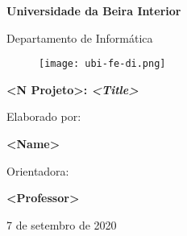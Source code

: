 \thispagestyle{empty}
\setcounter{page}{-1}

\begin{center}
\begin{Huge}
\textbf{Universidade da Beira Interior}
\end{Huge}
\end{center}

\begin{center}
\begin{Huge}
Departamento de Informática
\end{Huge}
\end{center}

\vspace{0,07cm}
\begin{figure}[!htb]
\centering
\texttt{[image: ubi-fe-di.png]}
\end{figure}

\vspace{0.5cm}
\begin{center}
\begin{Large}
\textbf{<N Projeto>: \emph{<Title>}}
\end{Large}
\end{center}


\vspace{0.5cm}
\begin{center}
\begin{normalsize}
\begin{large}
Elaborado por:
\end{large}
\end{normalsize}
\end{center}

\vspace{0.2cm}
\begin{center}
\begin{large}
\textbf{<Name>}
\end{large}
\end{center}

\vspace{0,5cm}
\begin{center}
\begin{normalsize}
\begin{large}
Orientadora:
\end{large}
\end{normalsize}
\end{center}

\vspace{0.2cm}
\begin{center}
\begin{large}
\textbf{<Professor>}
\end{large}
\end{center}



\vspace{0.5cm}
\begin{center}
\begin{normalsize}
7 de setembro de 2020
\end{normalsize}
\end{center}
